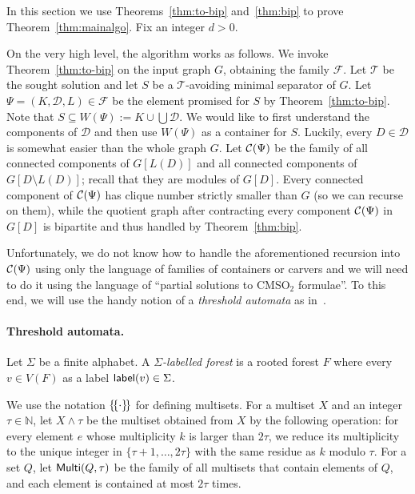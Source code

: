\documentclass[11pt,a4paper]{article}
\theoremstyle{definition}
\def\N{\mathbb{N}}
\def\T{\mathcal{T}}
\newcommand{\CMSO}{\textsf{CMSO}$_2$\xspace}
\newcommand{\cmsotwo}{\CMSO}
\begin{document}
In this section we use Theorems~\ref{thm:to-bip} and~\ref{thm:bip}
to prove Theorem~\ref{thm:mainalgo}.
Fix an integer $d > 0$. 

On the very high level, the algorithm works as follows.
We invoke Theorem~\ref{thm:to-bip} on the input graph $G$, obtaining the family $\mathcal{F}$.
Let $\T$ be the sought solution and let $S$ be a $\T$-avoiding minimal separator of $G$.
Let $\Psi = (K,\mathcal{D},L) \in \mathcal{F}$ be the element promised for $S$ by Theorem~\ref{thm:to-bip}.
Note that $S \subseteq W(\Psi) := K \cup \bigcup \mathcal{D}$. 
We would like to first understand the components of $\mathcal{D}$ and then use $W(\Psi)$ as a container for $S$. 
Luckily, every $D \in \mathcal{D}$ is somewhat easier than the whole graph $G$.
Let $\mathcal{C}(\Psi)$ be the family of all connected components of $G[L(D)]$ and all connected components of $G[D \setminus L(D)]$;
recall that they are modules of $G[D]$.
Every connected component of $\mathcal{C}(\Psi)$ has clique number strictly smaller than $G$ (so we can recurse on them),
while the quotient graph after contracting every component $\mathcal{C}(\Psi)$ in $G[D]$ is 
bipartite and thus handled by Theorem~\ref{thm:bip}.

Unfortunately, we do not know how to handle the aforementioned recursion into $\mathcal{C}(\Psi)$ using only the language of families of containers or carvers
and we will need to do it using the language of ``partial solutions to \cmsotwo formulae''. 
To this end, we will use the handy notion of a \emph{threshold automata} as in~\cite{DBLP:conf/soda/ChudnovskyMPPR24}.

\paragraph{Threshold automata.}
Let $\Sigma$ be a finite alphabet. 
A \emph{$\Sigma$-labelled forest} is a rooted forest $F$ where every $v \in V(F)$
as a label $\mathsf{label}(v) \in \Sigma$. 

We use the notation $\{\!\{\cdot\}\!\}$ for defining multisets. For a multiset $X$ and an integer $\tau\in \N$, let $X\wedge \tau$ be the multiset obtained from $X$ by the following operation: for every element $e$ whose multiplicity $k$ is larger than $2\tau$, we reduce its multiplicity to the unique integer in $\{\tau+1,\ldots,2\tau\}$ with the same residue as $k$ modulo $\tau$. For a set $Q$, let $\mathsf{Multi}(Q,\tau)$ be the family of all multisets
that contain elements of $Q$, and each element is contained at most $2\tau$ times.
\end{document}
